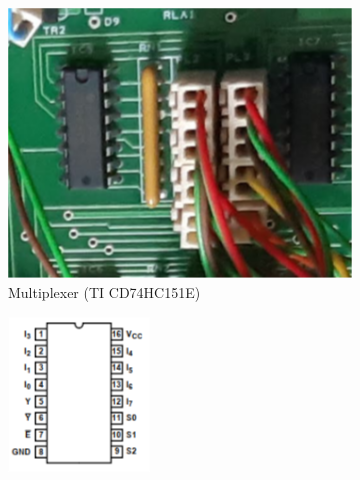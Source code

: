 \documentclass[12pt, a4paper]{article}
\begin{document}
\begin{figure}[h]
	\begin{subfigure}[t]{0.4\textwidth}
		\includegraphics[width=\textwidth]{remote_multiplexer} 
		\caption{Multiplexer (TI CD74HC151E)}
		\label{fig:multiplexer}
	\end{subfigure}
	\hfill%
	\begin{subfigure}[t]{0.2\textwidth}
		\includegraphics[width=\textwidth]{multiplexer_ports}

\end{subfigure}
\end{figure}
\end{document}
